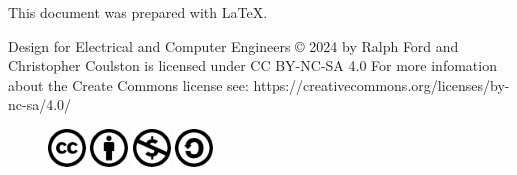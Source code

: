 This document was prepared with \LaTeX.
\vspace{2cm}

Design for Electrical and Computer Engineers © 2024 by Ralph Ford and Christopher Coulston is licensed under CC BY-NC-SA 4.0 
For more infomation about the Create Commons license see: https://creativecommons.org/licenses/by-nc-sa/4.0/

\begin{figure}[h]
\includegraphics[width=1cm]{./Fig/cc-logo.pdf}
\includegraphics[width=1cm]{./Fig/cc-by.pdf}
\includegraphics[width=1cm]{./Fig/cc-nc.pdf}
\includegraphics[width=1cm]{./Fig/cc-sa.pdf}
\end{figure}